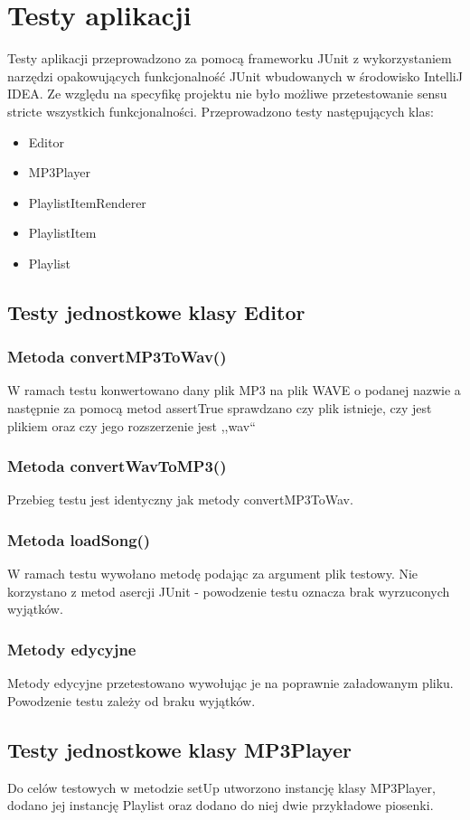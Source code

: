 \documentclass[12pt,a4paper,notitlepage]{article}
\begin{document}
\section{Testy aplikacji}
Testy aplikacji przeprowadzono za pomocą frameworku JUnit z wykorzystaniem narzędzi opakowujących funkcjonalność JUnit wbudowanych w środowisko IntelliJ IDEA. Ze względu na specyfikę projektu 
nie było możliwe przetestowanie sensu stricte wszystkich funkcjonalności. Przeprowadzono testy następujących klas:
\begin{itemize}
 \item Editor
 \item MP3Player
 \item PlaylistItemRenderer
 \item PlaylistItem
 \item Playlist
\end{itemize}

\subsection{Testy jednostkowe klasy Editor}
\subsubsection{Metoda convertMP3ToWav()}
W ramach testu konwertowano dany plik MP3 na plik WAVE o podanej nazwie a następnie za pomocą metod assertTrue sprawdzano czy plik istnieje, czy jest plikiem oraz czy jego rozszerzenie jest ,,wav``
\subsubsection{Metoda convertWavToMP3()}
Przebieg testu jest identyczny jak metody convertMP3ToWav.
\subsubsection{Metoda loadSong()}
W ramach testu wywołano metodę podając za argument plik testowy. Nie korzystano z metod asercji JUnit - powodzenie testu oznacza brak wyrzuconych wyjątków.
\subsubsection{Metody edycyjne}
Metody edycyjne przetestowano wywołując je na poprawnie załadowanym pliku. Powodzenie testu zależy od braku wyjątków.

\subsection{Testy jednostkowe klasy MP3Player}
Do celów testowych w metodzie setUp utworzono instancję klasy MP3Player, dodano jej instancję Playlist oraz dodano do niej dwie przykładowe piosenki.
\end{document}
